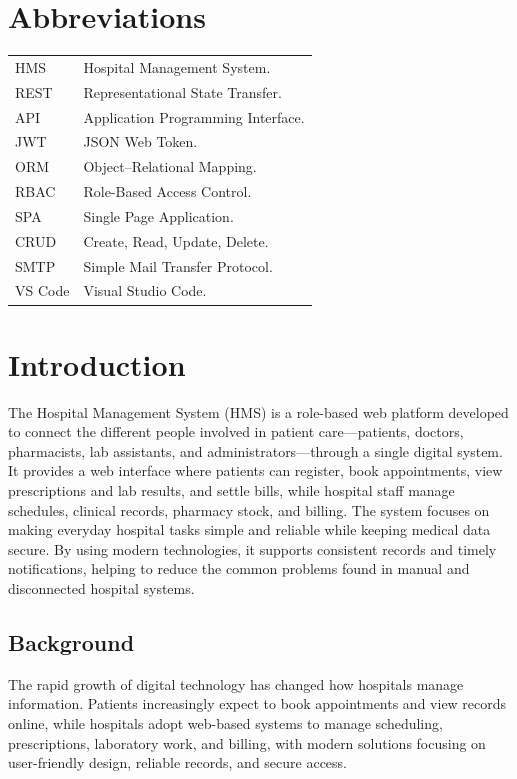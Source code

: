 \documentclass[12pt,a4paper]{report}
\begin{document}
\chapter*{Abbreviations}
\begin{tabular}{@{}p{3cm}p{11cm}@{}}
HMS     & Hospital Management System. \\
REST    & Representational State Transfer. \\
API     & Application Programming Interface. \\
JWT     & JSON Web Token. \\
ORM     & Object--Relational Mapping. \\
RBAC    & Role-Based Access Control. \\
SPA     & Single Page Application. \\
CRUD    & Create, Read, Update, Delete. \\
SMTP    & Simple Mail Transfer Protocol. \\
VS Code & Visual Studio Code. \\
\end{tabular}

\clearpage
{}

\chapter{Introduction}
The Hospital Management System (HMS) is a role-based web platform developed to
connect the different people involved in patient care---patients, doctors, pharmacists,
lab assistants, and administrators---through a single digital system. It provides a
web interface where patients can register, book appointments, view prescriptions and
lab results, and settle bills, while hospital staff manage schedules, clinical records,
pharmacy stock, and billing. The system focuses on making everyday hospital tasks
simple and reliable while keeping medical data secure. By using modern technologies,
it supports consistent records and timely notifications, helping to reduce the common
problems found in manual and disconnected hospital systems.

\section{Background}
The rapid growth of digital technology has changed how hospitals manage information.
Patients increasingly expect to book appointments and view records online, while
hospitals adopt web-based systems to manage scheduling, prescriptions, laboratory
work, and billing, with modern solutions focusing on user-friendly design, reliable
records, and secure access.
\end{document}
